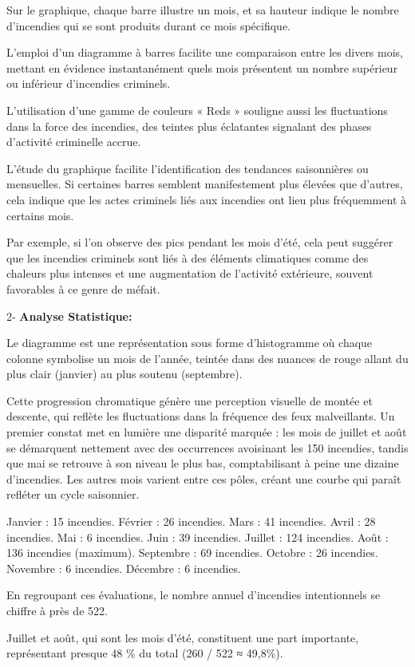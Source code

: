 \documentclass[
]{article}
\begin{document}
Sur le graphique, chaque barre illustre un mois, et sa hauteur indique
le nombre d'incendies qui se sont produits durant ce mois spécifique.

L'emploi d'un diagramme à barres facilite une comparaison entre les
divers mois, mettant en évidence instantanément quels mois présentent un
nombre supérieur ou inférieur d'incendies criminels.

L'utilisation d'une gamme de couleurs « Reds » souligne aussi les
fluctuations dans la force des incendies, des teintes plus éclatantes
signalant des phases d'activité criminelle accrue.

L'étude du graphique facilite l'identification des tendances
saisonnières ou mensuelles. Si certaines barres semblent manifestement
plus élevées que d'autres, cela indique que les actes criminels liés aux
incendies ont lieu plus fréquemment à certains mois.

Par exemple, si l'on observe des pics pendant les mois d'été, cela peut
suggérer que les incendies criminels sont liés à des éléments
climatiques comme des chaleurs plus intenses et une augmentation de
l'activité extérieure, souvent favorables à ce genre de méfait.

2- \textbf{Analyse Statistique:}

Le diagramme est une représentation sous forme d'histogramme où chaque
colonne symbolise un mois de l'année, teintée dans des nuances de rouge
allant du plus clair (janvier) au plus soutenu (septembre).

Cette progression chromatique génère une perception visuelle de montée
et descente, qui reflète les fluctuations dans la fréquence des feux
malveillants. Un premier constat met en lumière une disparité marquée :
les mois de juillet et août se démarquent nettement avec des occurrences
avoisinant les 150 incendies, tandis que mai se retrouve à son niveau le
plus bas, comptabilisant à peine une dizaine d'incendies. Les autres
mois varient entre ces pôles, créant une courbe qui paraît refléter un
cycle saisonnier.

Janvier : 15 incendies. Février : 26 incendies. Mars : 41 incendies.
Avril : 28 incendies. Mai : 6 incendies. Juin : 39 incendies. Juillet :
124 incendies. Août : 136 incendies (maximum). Septembre : 69 incendies.
Octobre : 26 incendies. Novembre : 6 incendies. Décembre : 6 incendies.

En regroupant ces évaluations, le nombre annuel d'incendies
intentionnels se chiffre à près de 522.

Juillet et août, qui sont les mois d'été, constituent une part
importante, représentant presque 48 \% du total (260 / 522 ≈ 49,8\%).
\end{document}
